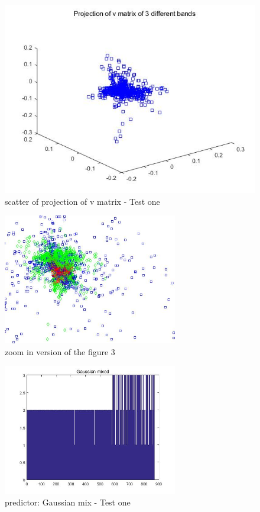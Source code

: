 \documentclass[12pt,letterpaper]{article}
\begin{document}
\begin{figure}[h]
	\centering
	\includegraphics[width=5.0in]{p3}
	\caption{scatter of projection of v matrix - Test one}
	
\end{figure}
\begin{figure}[h]
	\centering
	\includegraphics[width=3.0in]{p2}
	\caption{zoom in version of the figure 3}
	
\end{figure}
\begin{figure}[h]
	\centering
	\includegraphics[width=3.0in]{p5}
	\caption{predictor: Gaussian mix - Test one}
	
\end{figure}
\end{document}
